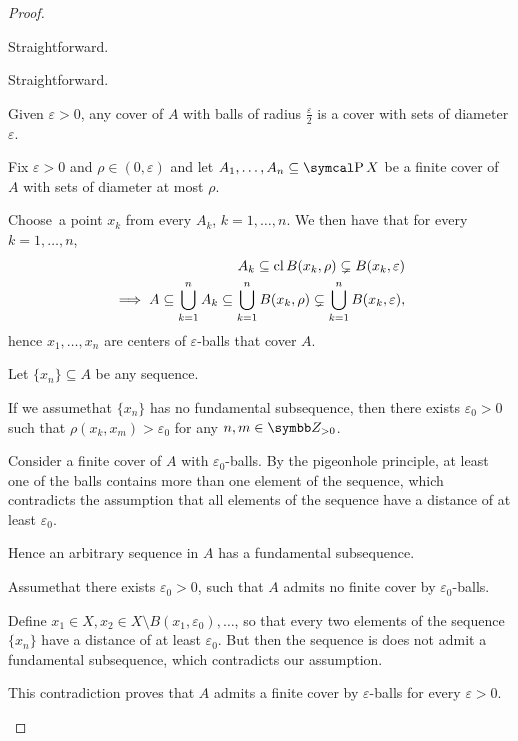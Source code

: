 \begin{proof}
  \begin{description}
     Straightforward.

     Straightforward.

     Given \( \varepsilon > 0 \), any cover of \( A \) with balls of radius \( \frac \varepsilon 2 \) is a cover with sets of diameter \( \varepsilon \).

     Fix \( \varepsilon > 0 \) and \( \rho \in (0, \varepsilon) \) and let \( A_1, \ldots, A_n \subseteq \Power X \) be a finite cover of \( A \) with sets of diameter at most \( \rho \).

    Choose\AOC~a point \( x_k \) from every \( A_k \), \( k = 1, \ldots, n \). We then have that for every \( k = 1, \ldots, n \),
    \begin{align*}
      A_k \subseteq \operatorname{cl} B(x_k, \rho) \subsetneq B(x_k, \varepsilon)
      \\
      \implies A \subseteq \bigcup_{k=1}^n A_k \subseteq \bigcup_{k=1}^n B(x_k, \rho) \subsetneq \bigcup_{k=1}^n B(x_k, \varepsilon),
    \end{align*}
    hence \( x_1, \ldots, x_n \) are centers of \( \varepsilon \)-balls that cover \( A \).

     Let \( \{ x_n \} \subseteq A \) be any sequence.

    If we assume\LEM that \( \{ x_n \} \) has no fundamental subsequence, then there exists \( \varepsilon_0 > 0 \) such that \( \rho(x_k, x_m) > \varepsilon_0 \) for any \( n, m \in \BZ_{>0} \).

    Consider a finite cover of \( A \) with \( \varepsilon_0 \)-balls. By the pigeonhole principle, at least one of the balls contains more than one element of the sequence, which contradicts the assumption that all elements of the sequence have a distance of at least \( \varepsilon_0 \).

    Hence an arbitrary sequence in \( A \) has a fundamental subsequence.

     Assume\LEM that there exists \( \varepsilon_0 > 0 \), such that \( A \) admits no finite cover by \( \varepsilon_0 \)-balls.

    Define \( x_1 \in X, x_2 \in X \setminus B(x_1, \varepsilon_0), \ldots \), so that every two elements of the sequence \( \{ x_n \} \) have a distance of at least \( \varepsilon_0 \). But then the sequence is does not admit a fundamental subsequence, which contradicts our assumption.

    This contradiction proves that \( A \) admits a finite cover by \( \varepsilon \)-balls for every \( \varepsilon > 0 \).
  \end{description}
\end{proof}

